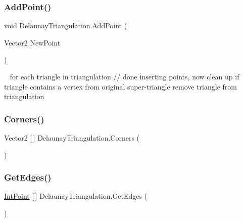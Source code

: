 \subsubsection{\texorpdfstring{Add\+Point()}{AddPoint()}}
{\footnotesize\ttfamily void Delaunay\+Triangulation.\+Add\+Point (\begin{DoxyParamCaption}\item[{Vector2}]{New\+Point }\end{DoxyParamCaption})}

~\newline
 for each triangle in triangulation // done inserting points, now clean up if triangle contains a vertex from original super-\/triangle remove triangle from triangulation\mbox{\label{class_delaunay_triangulation_a1f871cd0ab4b06003e92c9aa02683f5a}} 
\subsubsection{\texorpdfstring{Corners()}{Corners()}}
{\footnotesize\ttfamily Vector2 \mbox{[}$\,$\mbox{]} Delaunay\+Triangulation.\+Corners (\begin{DoxyParamCaption}{ }\end{DoxyParamCaption})}

\mbox{\label{class_delaunay_triangulation_afcf101ed329a388d5b2c1e720f3cfb41}} 
\subsubsection{\texorpdfstring{Get\+Edges()}{GetEdges()}}
{\footnotesize\ttfamily \mbox{\hyperlink{struct_int_point}{Int\+Point}} \mbox{[}$\,$\mbox{]} Delaunay\+Triangulation.\+Get\+Edges (\begin{DoxyParamCaption}{ }\end{DoxyParamCaption})}

\mbox{\label{class_delaunay_triangulation_a5c2e4b787760bd7aa248933bce6b97b2}} 
